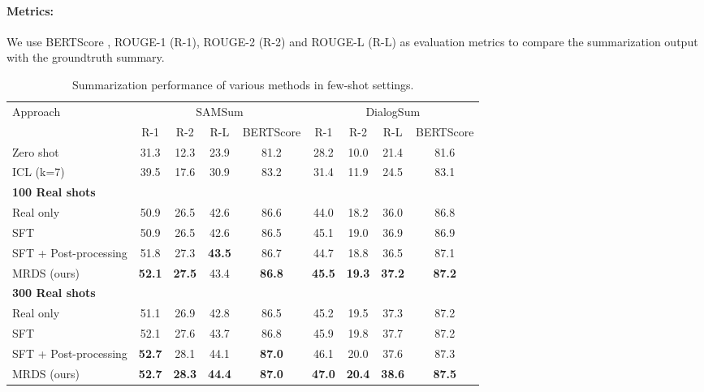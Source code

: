 \paragraph{Metrics:} We use BERTScore \citep{bert-score}, ROUGE-1 (R-1), ROUGE-2 (R-2) and ROUGE-L (R-L) \citep{lin-2004-rouge} as evaluation metrics to compare the summarization output with the groundtruth summary.






\begin{table*}[ht]
\centering
\caption{Summarization performance of various methods in few-shot settings.}
\label{tab:summarization}
\begin{tabular}{lcccc|cccc}
\toprule
\multirow{2}{*}{Approach} & \multicolumn{4}{c}{SAMSum} & \multicolumn{4}{c}{DialogSum} \\
\cmidrule(lr){2-5} \cmidrule(lr){6-9}
& R-1 & R-2 & R-L & BERTScore & R-1 & R-2 & R-L & BERTScore \\
\midrule
Zero shot & 31.3 & 12.3 & 23.9 & 81.2 & 28.2 & 10.0 & 21.4 & 81.6\\
ICL (k=7) & 39.5 & 17.6 & 30.9 & 83.2 & 31.4 & 11.9 & 24.5 & 83.1\\
\midrule
\textbf{100 Real shots} \\
\midrule
Real only & 50.9 & 26.5 & 42.6 & 86.6 & 44.0 & 18.2 & 36.0 & 86.8 \\ 
SFT & 50.9 & 26.5 & 42.6 & 86.5 & 45.1 & 19.0 & 36.9 & 86.9 \\ 
SFT + Post-processing & 51.8 & 27.3 & \textbf{43.5} & 86.7 & 44.7 & 18.8 & 36.5 & 87.1 \\
MRDS (ours) & \textbf{52.1} & \textbf{27.5} & 43.4 & \textbf{86.8} & \textbf{45.5} & \textbf{19.3} & \textbf{37.2} & \textbf{87.2} \\
\midrule
\textbf{300 Real shots} \\
\midrule
Real only & 51.1 & 26.9 & 42.8 & 86.5 & 45.2 & 19.5 & 37.3 & 87.2 \\
SFT & 52.1 & 27.6 & 43.7 & 86.8 & 45.9 & 19.8 & 37.7 & 87.2 \\ 
SFT + Post-processing & \textbf{52.7} & 28.1 & 44.1 & \textbf{87.0} & 46.1 & 20.0 & 37.6 & 87.3 \\
MRDS (ours) & \textbf{52.7} & \textbf{28.3} & \textbf{44.4} & \textbf{87.0} & \textbf{47.0} & \textbf{20.4} & \textbf{38.6} & \textbf{87.5} \\

\bottomrule
\end{tabular}
\end{table*}



